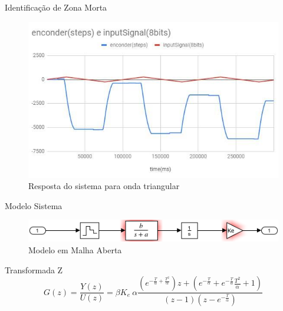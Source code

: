 \documentclass{beamer}
\begin{document}
\begin{frame}{Identificação de Zona Morta}
\begin{figure}
    \centering
    \includegraphics[width = \linewidth]{src/tex/img/grafico_dente_serra.jpg}
    \caption{Resposta do sistema para onda triangular}
    \label{fig:control_1}
\end{figure}
\end{frame}

\begin{frame}{Modelo Sistema}
    \begin{figure}
        \centering
        \includegraphics[width = 0.8\linewidth]{src/tex/img/system_open_loop.png}
        \caption{Modelo em Malha Aberta}
        \label{fig:system_model}
    \end{figure}
    
    \begin{block}{Transformada Z}
        \begin{equation}
        G(z) = \frac{Y(z)}{U(z)} = \beta K_e \ \alpha \frac{\left(e^{-\frac{T}{\alpha} + \frac{T^2}{\alpha}}\right)z + \left(e^{-\frac{T}{\alpha}}+e^{-\frac{T}{\alpha}}\frac{T^2}{\alpha}+1\right)  }{\left(z-1\right)\left(z-e^{-\frac{T}{\alpha}}\right)}
        \label{transfdisc}
        \end{equation}
    \end{block}
\end{frame}
\end{document}
